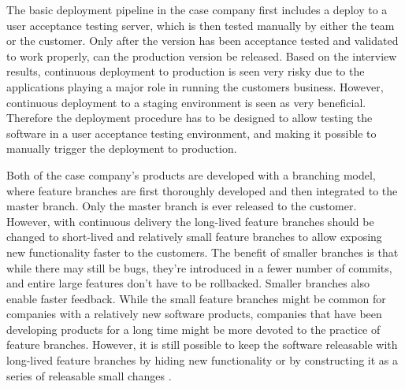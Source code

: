 \documentclass[english]{tktltiki2}
\theoremstyle{definition}
\theoremstyle{remark}
\begin{document}
The basic deployment pipeline in the case company first includes a deploy to a user acceptance testing server, which is then tested manually by either the team or the customer. Only after the version has been acceptance tested and validated to work properly, can the production version be released. Based on the interview results, continuous deployment to production is seen very risky due to the applications playing a major role in running the customers business. However, continuous deployment to a staging environment is seen as very beneficial. Therefore the deployment procedure has to be designed to allow testing the software in a user acceptance testing environment, and making it possible to manually trigger the deployment to production.

Both of the case company's products are developed with a branching model, where feature branches are first thoroughly developed and then integrated to the master branch. Only the master branch is ever released to the customer. However, with continuous delivery the long-lived feature branches should be changed to short-lived and relatively small feature branches to allow exposing new functionality faster to the customers. The benefit of smaller branches is that while there may still be bugs, they're introduced in a fewer number of commits, and entire large features don't have to be rollbacked. Smaller branches also enable faster feedback. While the small feature branches might be common for companies with a relatively new software products, companies that have been developing products for a long time might be more devoted to the practice of feature branches. However, it is still possible to keep the software releasable with long-lived feature branches by hiding new functionality or by constructing it as a series of releasable small changes \cite{cdbook}.
\end{document}
